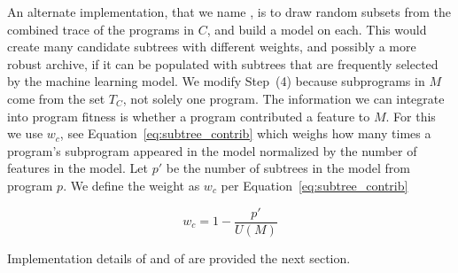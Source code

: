 An alternate implementation, that we name \DRAW,  is to draw random subsets from the combined trace of the programs in $C$, and build a model on each.  This would create many candidate subtrees with different weights, and possibly a more robust archive, if it can be populated with subtrees that are frequently selected by the machine learning model.  We modify Step~(4) because subprograms in $M$ come from the set $T_C$, not solely one program. The information we can integrate into program fitness is whether a program contributed a feature to $M$. For this we use $w_c$, see Equation~\ref{eq:subtree_contrib} which weighs how many times a program's subprogram appeared in the model normalized by the number of features in the model. Let $p'$ be the number of subtrees in the model from program $p$.  We define the weight as $w_c$ per Equation~\ref{eq:subtree_contrib}


\begin{equation}
\label{eq:subtree_contrib}
w_c = 1 - \frac{p'}{U(M)}
\end{equation}

Implementation details of \FULL and of \DRAW are provided the next section.  


